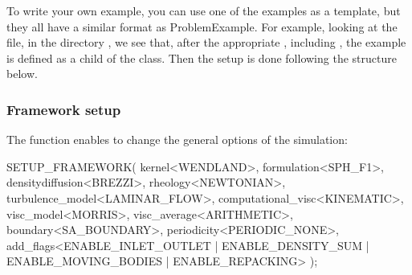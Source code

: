 \documentclass{../GPUSPHtemplate}
\begin{document}
To write your own example, you can use one of the examples as a template, 
but they all have a similar format as ProblemExample.  
For example, looking at the file,  in the directory 
, we see that, after the appropriate , 
including , the example is defined as a 
child of the  class.  
Then the setup is done following the structure below.

\subsubsection{Framework setup}

The  function enables to change the
 general options of the simulation:
\begin{ccode}
  SETUP_FRAMEWORK(
    kernel<WENDLAND>,
    formulation<SPH_F1>,
    densitydiffusion<BREZZI>,
    rheology<NEWTONIAN>,
    turbulence_model<LAMINAR_FLOW>,
    computational_visc<KINEMATIC>,
    visc_model<MORRIS>,
    visc_average<ARITHMETIC>,
    boundary<SA_BOUNDARY>,
    periodicity<PERIODIC_NONE>,
    add_flags<ENABLE_INLET_OUTLET | ENABLE_DENSITY_SUM 
        | ENABLE_MOVING_BODIES | ENABLE_REPACKING>
  );
\end{ccode}
\end{document}
